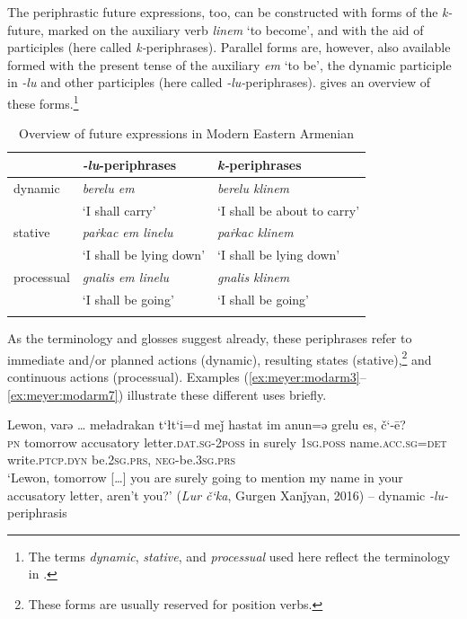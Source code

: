 \documentclass[output=paper,colorlinks,citecolor=brown]{langscibook}
\begin{document}
The periphrastic future expressions, too, can be constructed with forms of the \textit{k-}future, marked on the auxiliary verb \textit{linem} ‘to become’, and with the aid of participles (here called \textit{k-}periphrases). Parallel forms are, however, also available formed with the present tense of the auxiliary \textit{em} ‘to be’, the dynamic participle in \textit{-lu} and other participles (here called  \textit{-lu-}periphrases).  gives an overview of these forms.\footnote{The terms \textit{dynamic}, \textit{stative}, and \textit{processual} used here reflect the terminology in \citet{DumTragut2009}.}

\begin{table}
	
	\caption{Overview of future expressions in Modern Eastern Armenian}\label{tab:meyer:modarmfut}
	\begin{tabularx}{0.8\textwidth}{Xll}
		\lsptoprule    & \textit{-lu}-periphrases   & \textit{k-}periphrases                         \\ \midrule
		dynamic        & \textit{berelu em}        & \textit{berelu klinem}  \\
		               & ‘I shall carry’           &        ‘I shall be about to carry’                                            \\
		stative        & \textit{paṙkac em linelu} & \textit{paṙkac klinem}      \\
		               & ‘I shall be lying down’   &        ‘I shall be lying down’                                            \\
		processual     & \textit{gnalis em linelu} & \textit{gnalis klinem}           \\
		               & ‘I shall be going’        &          ‘I shall be going’                                          \\
		\lspbottomrule 
	\end{tabularx}
\end{table}

As the terminology and glosses suggest already, these periphrases refer to immediate and/or planned actions (dynamic), resulting states (stative),\footnote{These forms are usually reserved for position verbs.} and continuous actions (processual). Examples (\ref{ex:meyer:modarm3}–\ref{ex:meyer:modarm7}) illustrate these different uses briefly.


\ea \label{ex:meyer:modarm3}
\gll Lewon, varə … meładrakan t‘łt‘i=d meǰ hastat im anun=ə grelu es, č‘-ē?\\
	\textsc{pn} tomorrow {} accusatory letter.\textsc{dat.sg-2poss} in surely \textsc{1sg.poss} name.\textsc{acc.sg=det} write.\textsc{ptcp.dyn} be.\textsc{2sg.prs}, \textsc{neg-}be.\textsc{3sg.prs}\\
	\glt ‘Lewon, tomorrow […] you are surely going to mention my name in your accusatory letter, aren't you?’ (\textit{Lur č‘ka},  Gurgen Xanǰyan, 2016) – dynamic \textit{-lu-}periphrasis
	\z {}
\end{document}
